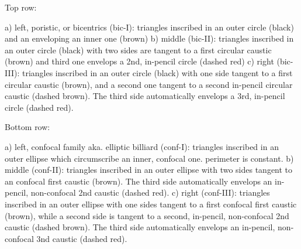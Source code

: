 Top row: 

a) left, poristic, or bicentrics (bic-I): triangles inscribed in an outer circle (black) and an enveloping an inner one (brown)
b) middle (bic-II): triangles inscribed in an outer circle (black) with two sides are tangent to a first circular caustic (brown) and third one envelops a 2nd, in-pencil circle (dashed red)
c) right (bic-III):  triangles inscribed in an outer circle (black) with one side tangent to a first circular caustic (brown), and a second one tangent to a second in-pencil circular caustic (dashed brown). The third side automatically envelops a 3rd, in-pencil circle (dashed red).

Bottom row:

a) left, confocal family aka. elliptic billiard (conf-I): triangles inscribed in an outer ellipse which circumscribe an inner, confocal one. perimeter is constant.
b) middle (conf-II): triangles inscribed in an outer ellipse with two sides tangent to an confocal first caustic (brown). The third side automatically envelops an in-pencil, non-confocal 2nd caustic (dashed red).
c) right (conf-III): triangles inscribed in an outer ellipse with one sides tangent to a first  confocal first caustic (brown), while a second side is tangent to a second, in-pencil, non-confocal 2nd caustic (dashed brown).  The third side automatically envelops an in-pencil, non-confocal 3nd caustic (dashed red).